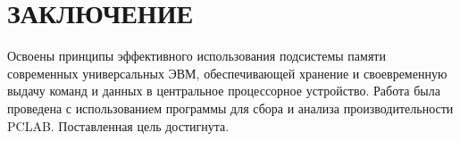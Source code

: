 \documentclass[a4paper,oneside,14pt]{extarticle}
\begin{document}




\newpage

\section*{ЗАКЛЮЧЕНИЕ}

Освоены принципы эффективного использования подсистемы памяти современных универсальных ЭВМ, обеспечивающей хранение и своевременную выдачу команд и данных в центральное процессорное устройство.
Работа была проведена с использованием программы для сбора и анализа производительности PCLAB.
Поставленная цель достигнута.
\end{document}
